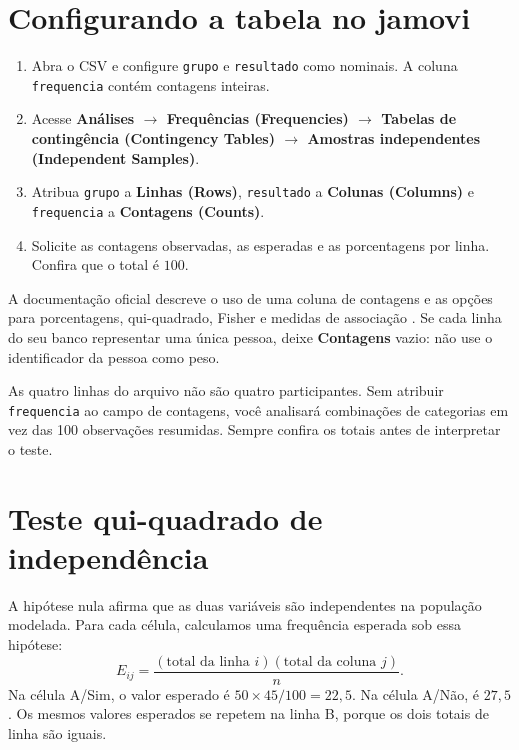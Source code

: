 \section{Configurando a tabela no jamovi}

\begin{enumerate}
  \item Abra o CSV e configure \texttt{grupo} e \texttt{resultado} como nominais. A coluna \texttt{frequencia} contém contagens inteiras.
  \item Acesse \textbf{Análises $\rightarrow$ Frequências (Frequencies) $\rightarrow$ Tabelas de contingência (Contingency Tables) $\rightarrow$ Amostras independentes (Independent Samples)}.
  \item Atribua \texttt{grupo} a \textbf{Linhas (Rows)}, \texttt{resultado} a \textbf{Colunas (Columns)} e \texttt{frequencia} a \textbf{Contagens (Counts)}.
  \item Solicite as contagens observadas, as esperadas e as porcentagens por linha. Confira que o total é $100$.
\end{enumerate}

A documentação oficial descreve o uso de uma coluna de contagens e as opções para porcentagens, qui-quadrado, Fisher e medidas de associação \parencite{JamoviContingencia}. Se cada linha do seu banco representar uma única pessoa, deixe \textbf{Contagens} vazio: não use o identificador da pessoa como peso.

\begin{tcolorbox}[colback=white,colframe=green,title={Dica de Conteúdo}]
As quatro linhas do arquivo não são quatro participantes. Sem atribuir \texttt{frequencia} ao campo de contagens, você analisará combinações de categorias em vez das 100 observações resumidas. Sempre confira os totais antes de interpretar o teste.
\end{tcolorbox}

\section{Teste qui-quadrado de independência}

A hipótese nula afirma que as duas variáveis são independentes na população modelada. Para cada célula, calculamos uma frequência esperada sob essa hipótese:
\[
E_{ij}=\frac{(\text{total da linha }i)(\text{total da coluna }j)}{n}.
\]
Na célula A/Sim, o valor esperado é $50\times45/100=22{,}5$. Na célula A/Não, é $27{,}5$. Os mesmos valores esperados se repetem na linha B, porque os dois totais de linha são iguais.

